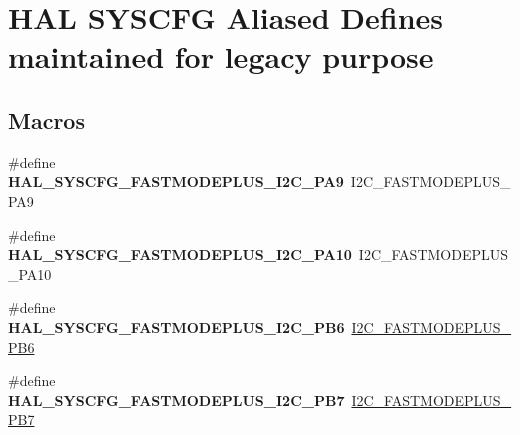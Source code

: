 \hypertarget{group___h_a_l___s_y_s_c_f_g___aliased___defines}{}\section{H\+AL S\+Y\+S\+C\+FG Aliased Defines maintained for legacy purpose}
\label{group___h_a_l___s_y_s_c_f_g___aliased___defines}
\subsection*{Macros}
\begin{DoxyCompactItemize}
\item 
\mbox{\label{group___h_a_l___s_y_s_c_f_g___aliased___defines_gab49ca938ca8481b3bd783423f840c1bd}} 
\#define {\bfseries H\+A\+L\+\_\+\+S\+Y\+S\+C\+F\+G\+\_\+\+F\+A\+S\+T\+M\+O\+D\+E\+P\+L\+U\+S\+\_\+\+I2\+C\+\_\+\+P\+A9}~I2\+C\+\_\+\+F\+A\+S\+T\+M\+O\+D\+E\+P\+L\+U\+S\+\_\+\+P\+A9
\item 
\mbox{\label{group___h_a_l___s_y_s_c_f_g___aliased___defines_ga51ca865a9860b7a43fbb46fb768e3657}} 
\#define {\bfseries H\+A\+L\+\_\+\+S\+Y\+S\+C\+F\+G\+\_\+\+F\+A\+S\+T\+M\+O\+D\+E\+P\+L\+U\+S\+\_\+\+I2\+C\+\_\+\+P\+A10}~I2\+C\+\_\+\+F\+A\+S\+T\+M\+O\+D\+E\+P\+L\+U\+S\+\_\+\+P\+A10
\item 
\mbox{\label{group___h_a_l___s_y_s_c_f_g___aliased___defines_ga615cfdee08ad61f7b1581775e4e0385e}} 
\#define {\bfseries H\+A\+L\+\_\+\+S\+Y\+S\+C\+F\+G\+\_\+\+F\+A\+S\+T\+M\+O\+D\+E\+P\+L\+U\+S\+\_\+\+I2\+C\+\_\+\+P\+B6}~\mbox{\hyperlink{group___i2_c_ex___fast_mode_plus_ga9b3b77b0f00f09ee6d272d70dd5663f5}{I2\+C\+\_\+\+F\+A\+S\+T\+M\+O\+D\+E\+P\+L\+U\+S\+\_\+\+P\+B6}}
\item 
\mbox{\label{group___h_a_l___s_y_s_c_f_g___aliased___defines_gaacdf5fce976c3d425f3aac760f4dc90d}} 
\#define {\bfseries H\+A\+L\+\_\+\+S\+Y\+S\+C\+F\+G\+\_\+\+F\+A\+S\+T\+M\+O\+D\+E\+P\+L\+U\+S\+\_\+\+I2\+C\+\_\+\+P\+B7}~\mbox{\hyperlink{group___i2_c_ex___fast_mode_plus_gaaa6d3f6c1d635a2f5e4dbe2ef66ce1c3}{I2\+C\+\_\+\+F\+A\+S\+T\+M\+O\+D\+E\+P\+L\+U\+S\+\_\+\+P\+B7}}

\end{DoxyCompactItemize}
